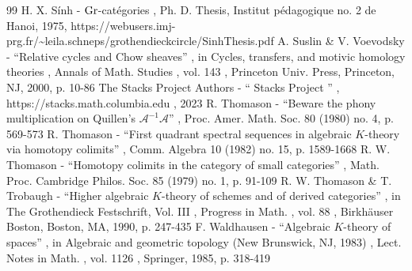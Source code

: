 \documentclass[11pt]{article}
\theoremstyle{plain}
\theoremstyle{definition}
\begin{document}
\begin{thebibliography}{99}
 H. X. Sính - ${\rm Gr}$-catégories , Ph. D. Thesis, Institut pédagogique no. 2 de Hanoi, 1975, https://webusers.imj-prg.fr/\textasciitilde{}leila.schneps/grothendieckcircle/SinhThesis.pdf
 A. Suslin \& V. Voevodsky - “Relative cycles and Chow sheaves” , in Cycles, transfers, and motivic homology theories , Annals of Math. Studies , vol. 143 , Princeton Univ. Press, Princeton, NJ, 2000, p. 10-86
 The Stacks Project Authors - “ Stacks Project ” , https://stacks.math.columbia.edu , 2023
 R. Thomason - “Beware the phony multiplication on Quillen’s ${\mathscr{A}}^{-1}{\mathscr{A}}$” , Proc. Amer. Math. Soc. 80 (1980) no. 4, p. 569-573
 R. Thomason - “First quadrant spectral sequences in algebraic $K$-theory via homotopy colimits” , Comm. Algebra 10 (1982) no. 15, p. 1589-1668
 R. W. Thomason - “Homotopy colimits in the category of small categories” , Math. Proc. Cambridge Philos. Soc. 85 (1979) no. 1, p. 91-109
 R. W. Thomason \& T. Trobaugh - “Higher algebraic $K$-theory of schemes and of derived categories” , in The Grothendieck Festschrift, Vol. III , Progress in Math. , vol. 88 , Birkhäuser Boston, Boston, MA, 1990, p. 247-435
 F. Waldhausen - “Algebraic $K$-theory of spaces” , in Algebraic and geometric topology (New Brunswick, NJ, 1983) , Lect. Notes in Math. , vol. 1126 , Springer, 1985, p. 318-419
\end{thebibliography}
\end{document}
